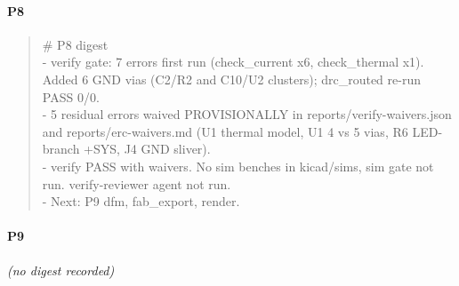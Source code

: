 \documentclass[11pt]{article}
\begin{document}
\paragraph*{P8}
\begin{quote}\small\ttfamily\raggedright
\# P8 digest\\
- verify gate: 7 errors first run (check\_current x6, check\_thermal x1). Added 6 GND vias (C2/R2 and C10/U2 clusters); drc\_routed re-run PASS 0/0.\\
- 5 residual errors waived PROVISIONALLY in reports/verify-waivers.json and reports/erc-waivers.md (U1 thermal model, U1 4 vs 5 vias, R6 LED-branch +SYS, J4 GND sliver).\\
- verify PASS with waivers. No sim benches in kicad/sims, sim gate not run. verify-reviewer agent not run.\\
- Next: P9 dfm, fab\_export, render.
\end{quote}
\paragraph*{P9}
\emph{(no digest recorded)}
\end{document}
